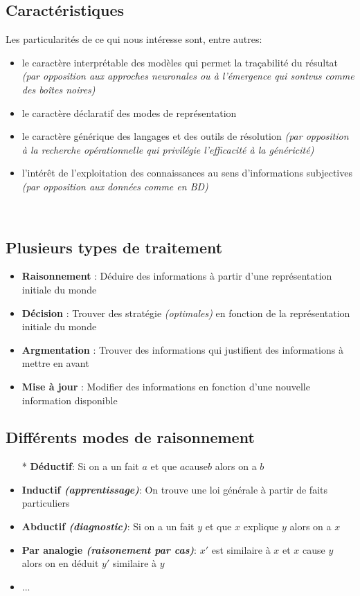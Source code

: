 \documentclass[a4paper,12pt]{article}
\begin{document}
	\subsection{Caractéristiques}
	Les particularités de ce qui nous intéresse sont, entre autres:
	\begin{itemize}
		\item le caractère interprétable des modèles qui permet la \og{}traçabilité\fg{} du résultat \emph{(par opposition aux approches neuronales ou à l'émergence qui sontvus comme des boîtes noires)}
		\item le caractère déclaratif des modes de représentation
		\item le caractère générique des langages et des outils de résolution \emph{(par opposition à la recherche opérationnelle qui privilégie l'efficacité à la généricité)}
		\item l'intérêt de l'exploitation des connaissances au sens d'informations subjectives \emph{(par opposition aux données comme en BD)}
	\end{itemize}
	~
	
	\subsection{Plusieurs types de traitement}
	\begin{itemize}
		\item \textbf{Raisonnement} : Déduire des informations à partir d'une représentation initiale du monde
		\item \textbf{Décision} : Trouver des stratégie \emph{(optimales)} en fonction de la représentation initiale du monde
		\item \textbf{Argmentation} : Trouver des informations qui justifient des informations à mettre en avant 
		\item \textbf{Mise à jour} : Modifier des informations en fonction d'une nouvelle information disponible
	\end{itemize}
	
	\subsection{Différents modes de raisonnement}
	\begin{itemize}
		\item[*] \textbf{Déductif}: Si on a un fait $a$ et que $a$\og{}cause\fg{}$b$ alors on a $b$
		\item \textbf{Inductif \emph{(apprentissage)}}: On trouve une loi générale à partir de faits particuliers
		\item \textbf{Abductif \emph{(diagnostic)}}: Si on a un fait $y$ et que $x$ explique $y$ alors on a $x$
		\item \textbf{Par analogie \emph{(raisonement par cas)}}: $x'$ est similaire à $x$ et $x$ \og{}cause\fg{} $y$ alors on en déduit $y'$ similaire à $y$
		\item ...
	\end{itemize}
	
\end{document}
